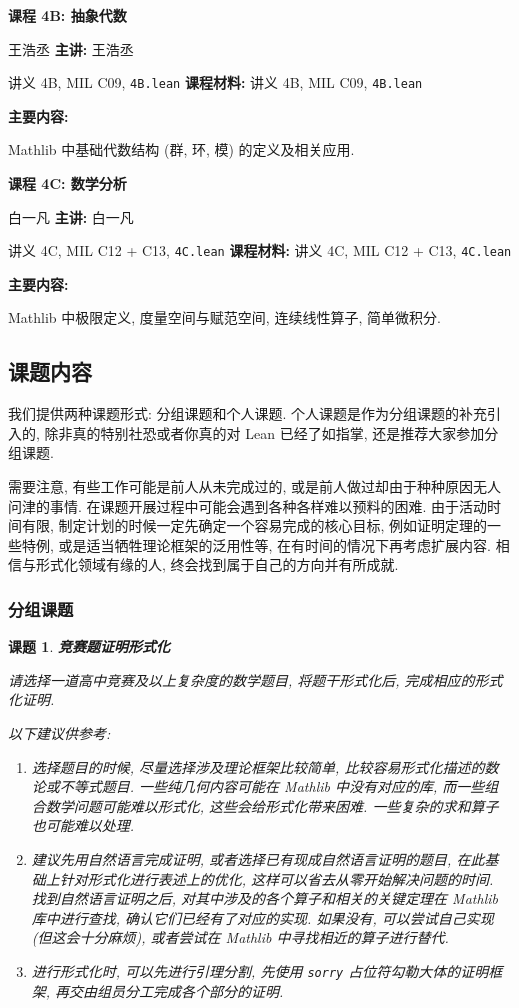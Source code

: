 \documentclass[UTF8]{ctexart}
\DeclareMathOperator{\0}{\mathbf{0}}                    %
\newcommand{\<}{\langle}
\renewcommand{\>}{\rangle}                              %
\newenvironment{thm_box}{
    \begin{tcolorbox}[enhanced, colback=thm_blue2, boxrule=0pt, frame hidden,
        borderline west={0.7mm}{0.1mm}{thm_blue1},breakable]
    }
    {\end{tcolorbox}}
\newenvironment{xmp_box}{
    \begin{tcolorbox}[enhanced, colback=xmp_purple2, boxrule=0pt, frame hidden,
        borderline west={0.7mm}{0.1mm}{xmp_purple1},breakable]
    }
    {\end{tcolorbox}}
\theoremstyle{MyStyle} %
\newenvironment{crs}[4]
{
    \begin{thm_box}
        \textbf{课程 #1: #2}
        
        \ifx\relax#3\relax\else %
            \textbf{主讲: }#3 %
        \fi
        
        \ifx\relax#4\relax\else %
            \textbf{课程材料: }#4 %
        \fi

        \textbf{主要内容: }
}
{
    \end{thm_box}
}
\newtheorem{project}{课题}
\newenvironment{prj}[1]
{
    \begin{xmp_box}
        \begin{project}
            \textbf{#1}
            \newline
}
{
        \end{project}
    \end{xmp_box}
}
\begin{document}
            \begin{crs}
                {4B}
                {抽象代数}
                {王浩丞}
                {讲义 4B, MIL C09, \texttt{4B.lean}}
                Mathlib 中基础代数结构 (群, 环, 模) 的定义及相关应用. 
            \end{crs}
            
            \begin{crs}
                {4C}
                {数学分析}
                {白一凡}
                {讲义 4C, MIL C12 + C13, \texttt{4C.lean}}
                Mathlib 中极限定义, 度量空间与赋范空间, 连续线性算子, 简单微积分. 
            \end{crs}

        \subsection{课题内容}

            我们提供两种课题形式: 分组课题和个人课题. 个人课题是作为分组课题的补充引入的, 除非真的特别社恐或者你真的对 Lean 已经了如指掌, 还是推荐大家参加分组课题. 

            需要注意, 有些工作可能是前人从未完成过的, 或是前人做过却由于种种原因无人问津的事情. 在课题开展过程中可能会遇到各种各样难以预料的困难. 由于活动时间有限, 制定计划的时候一定先确定一个容易完成的核心目标, 例如证明定理的一些特例, 或是适当牺牲理论框架的泛用性等, 在有时间的情况下再考虑扩展内容. 相信与形式化领域有缘的人, 终会找到属于自己的方向并有所成就. 

        \subsubsection{分组课题}
            
            \begin{prj}
                {竞赛题证明形式化}
                请选择一道高中竞赛及以上复杂度的数学题目, 将题干形式化后, 完成相应的形式化证明. 

                以下建议供参考: 
                \begin{enumerate}
                    \item 选择题目的时候, 尽量选择涉及理论框架比较简单, 比较容易形式化描述的数论或不等式题目. 一些纯几何内容可能在 Mathlib 中没有对应的库, 而一些组合数学问题可能难以形式化, 这些会给形式化带来困难. 一些复杂的求和算子也可能难以处理. 
                    \item 建议先用自然语言完成证明, 或者选择已有现成自然语言证明的题目, 在此基础上针对形式化进行表述上的优化, 这样可以省去从零开始解决问题的时间. 找到自然语言证明之后, 对其中涉及的各个算子和相关的关键定理在 Mathlib 库中进行查找, 确认它们已经有了对应的实现. 如果没有, 可以尝试自己实现 (但这会十分麻烦), 或者尝试在 Mathlib 中寻找相近的算子进行替代. 
                    \item 进行形式化时, 可以先进行引理分割, 先使用 \texttt{\color{red}sorry} 占位符勾勒大体的证明框架, 再交由组员分工完成各个部分的证明. 
                \end{enumerate}
            \end{prj}
\end{document}
